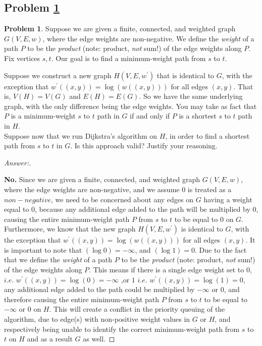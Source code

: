 \documentclass[11pt]{article}
\theoremstyle{definition}
\theoremstyle{definition}
\newtheorem{required}{Problem}
\theoremstyle{definition}
\begin{document}
\subsection{Problem \ref{Dijkstra1}}
\begin{required} \label{Dijkstra1}
Suppose we are given a finite, connected, and weighted graph $G(V, E, w)$, where the edge weights are non-negative. We define the \emph{weight} of a path $P$ to be the \emph{product} (note: product, \emph{not} sum!) of the edge weights along $P$. Fix vertices $s, t$. Our goal is to find a minimum-weight path from $s$ to $t$. 

\begin{enumerate}[label=(\alph*)]
\item Suppose we construct a new graph $H(V, E, w^{\prime})$ that is identical to $G$, with the exception that $w^{\prime}((x, y)) = \log(w((x, y)))$ for all edges $(x,y)$. That is, $V(H) = V(G)$ and $E(H) = E(G)$. So we have the same underlying graph, with the only difference being the edge weights. You may take as fact that $P$ is a minimum-weight $s$ to $t$ path in $G$ if and only if $P$ is a shortest $s$ to $t$ path in $H$. \\

\noindent Suppose now that we run Dijkstra's algorithm on $H$, in order to find a shortest path from $s$ to $t$ in $G$. Is this approach valid? Justify your reasoning.

\begin{proof}[Answer:] \
\item \textbf{No.} Since we are given a finite, connected, and weighted graph $G(V, E, w)$, where the edge weights are non-negative, and we assume $0$ is treated as a $non-negative$, we need to be concerned about any edges on $G$ having a weight equal to $0$, because any additional edge added to the path will be multiplied by $0$, causing the entire minimum-weight path $P$ from $s$ to $t$ to be equal to $0$ on $G$. Furthermore, we know that the new graph $H(V, E, w^{\prime})$ is identical to $G$, with the exception that $w^{\prime}((x, y)) = \log(w((x, y)))$ for all edges $(x,y)$. It is important to note that $(\log{0}) = -\infty$, and $(\log{1}) = 0$. Due to the fact that we define the \emph{weight} of a path $P$ to be the \emph{product} (note: product, \emph{not} sum!) of the edge weights along $P$. This means if there is a single edge weight set to $0$, $i.e.$ $w^{\prime}((x, y)) = \log(0) = -\infty$ ,or $1$ $i.e.$ $w^{\prime}((x, y)) = \log(1) = 0$, any additional edge added to the path could  be multiplied by $-\infty$ or $0$, and therefore causing the entire minimum-weight path $P$ from $s$ to $t$ to be equal to $-\infty$ or $0$ on $H$. This will create a conflict in the priority queuing of the algorithm, due to edge(s) with non-positive weight values in $G$ or $H$, and respectively being unable to identify the correct minimum-weight path from $s$ to $t$ on $H$ and as a result $G$ as well.
\end{proof}


\end{enumerate}
\end{required}
\end{document}
